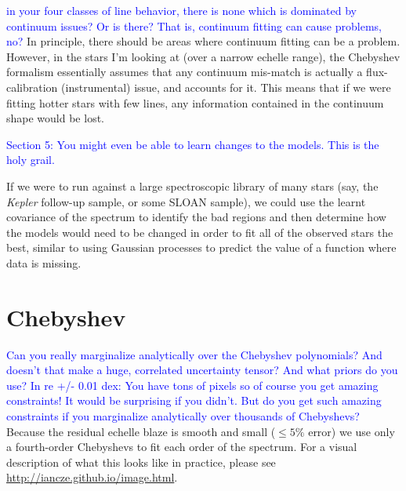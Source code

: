 \documentclass[preprint]{aastex} %
\newcommand{\hcom}[1]{ \textcolor{Blue}{#1}}
\begin{document}
\hcom{in your four classes of line behavior, there is none which is dominated by continuum issues? Or is there? That is, continuum fitting can cause problems, no?}
In principle, there should be areas where continuum fitting can be a problem. However, in the stars I'm looking at (over a narrow echelle range), the Chebyshev formalism essentially assumes that any continuum mis-match is actually a flux-calibration (instrumental) issue, and accounts for it. This means that if we were fitting hotter stars with few lines, any information contained in the continuum shape would be lost. 

\hcom{Section 5: You might even be able to learn changes to the models. This is the holy grail.}

If we were to run against a large spectroscopic library of many stars (say, the \emph{Kepler} follow-up sample, or some SLOAN sample), we could use the learnt covariance of the spectrum to identify the bad regions and then determine how the models would need to be changed in order to fit all of the observed stars the best, similar to using Gaussian processes to predict the value of a function where data is missing. 

\section{Chebyshev}
\hcom{Can you really marginalize analytically over the Chebyshev polynomials? And doesn't that make a huge, correlated uncertainty tensor? And what priors do you use?}
\hcom{In re +/- 0.01 dex: You have tons of pixels so of course you get amazing constraints! It would be surprising if you didn't. But do you get such amazing constraints if you marginalize analytically over thousands of Chebyshevs?}
Because the residual echelle blaze is smooth and small ($\le 5\%$ error) we use only a fourth-order Chebyshevs to fit each order of the spectrum. For a visual description of what this looks like in practice, please see \url{http://iancze.github.io/image.html}.




\end{document}
